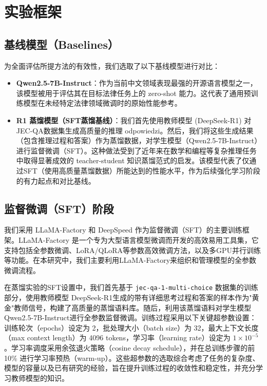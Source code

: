 \documentclass{article}
\newcommand{\qwen}{Qwen2.5-7B-Instruct}
\newcommand{\deepseekr}{DeepSeek-R1}
\newcommand{\qwen}{Qwen2.5-7B-Instruct}
\newcommand{\deepseekr}{DeepSeek-R1}
\begin{document}
\section{实验框架}

\subsection{基线模型（Baselines）}

为全面评估所提方法的有效性，我们选取了以下基线模型进行对比：
\begin{itemize}
\item \textbf{\qwen}：作为当前中文领域表现最强的开源语言模型之一\cite{yang2024qwen2}，该模型被用于评估其在目标法律任务上的 zero-shot 能力。这代表了通用预训练模型在未经特定法律领域微调时的原始性能参考。
\item \textbf{R1 蒸馏模型（SFT蒸馏基线）}：我们首先使用教师模型 (\deepseekr) 对JEC-QA数据集生成高质量的推理 odpowiedzi。然后，我们将这些生成结果（包含推理过程和答案）作为蒸馏数据，对学生模型（\qwen）进行监督微调（SFT）。这种做法受到了近年来在数学和编程等复杂推理任务中取得显著成效的 teacher-student 知识蒸馏范式的启发\cite{guo2025deepseek}。该模型代表了仅通过SFT（使用高质量蒸馏数据）所能达到的性能水平，作为后续强化学习阶段的有力起点和对比基线。
\end{itemize}

\subsection{监督微调（SFT）阶段}

我们采用 LLaMA-Factory 和 DeepSpeed 作为监督微调（SFT）的主要训练框架。LLaMA-Factory 是一个专为大型语言模型微调而开发的高效易用工具集，它支持包括全参数微调、LoRA/QLoRA等参数高效微调方法，以及多GPU并行训练等功能\cite{llamafactory}。在本研究中，我们主要利用LLaMA-Factory来组织和管理模型的全参数微调流程。

在蒸馏实验的SFT设置中，我们首先基于 \texttt{jec-qa-1-multi-choice} 数据集的训练部分，使用教师模型 \deepseekr 生成的带有详细思考过程和答案的样本作为"黄金"教师信号，构建了高质量的蒸馏语料库。随后，利用该蒸馏语料对学生模型 \qwen 进行全参数监督微调。训练过程采用以下关键超参数设置：训练轮次（epochs）设定为 2，批处理大小（batch size）为 32，最大上下文长度（max context length）为 4096 tokens，学习率（learning rate）设定为 $1 \times 10^{-5}$。学习率调度采用余弦退火策略（cosine decay schedule），并在总训练步骤的前 10\% 进行学习率预热（warm-up）。这些超参数的选取综合考虑了任务的复杂度、模型的容量以及已有研究的经验，旨在提升训练过程的收敛性和稳定性，并充分学习教师模型的知识。
\end{document}
